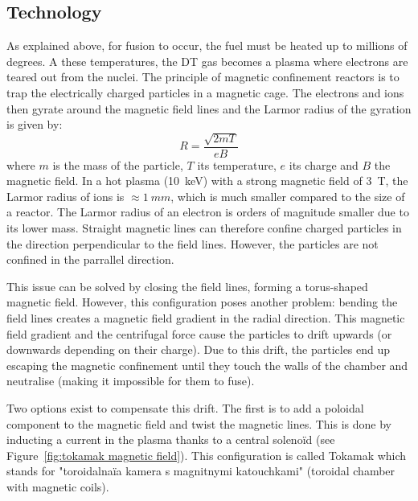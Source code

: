 \subsection{Technology}
As explained above, for fusion to occur, the fuel must be heated up to millions of degrees.
A these temperatures, the DT gas becomes a plasma where electrons are teared out from the nuclei.
The principle of magnetic confinement reactors is to trap the electrically charged particles in a magnetic cage.
The electrons and ions then gyrate around the magnetic field lines and the Larmor radius of the gyration is given by:
\begin{equation}
    R =  \frac{\sqrt{2 m T}}{e B}
\end{equation}
where $m$ is the mass of the particle, $T$ its temperature, $e$ its charge and $B$ the magnetic field.
In a hot plasma (\SI{10}{keV}) with a strong magnetic field of \SI{3}{T}, the Larmor radius of ions is $\approx \SI{1}{mm}$, which is much smaller compared to the size of a reactor.
The Larmor radius of an electron is orders of magnitude smaller due to its lower mass.
Straight magnetic lines can therefore confine charged particles in the direction perpendicular to the field lines.
However, the particles are not confined in the parrallel direction.

This issue can be solved by closing the field lines, forming a torus-shaped magnetic field.
However, this configuration poses another problem: bending the field lines creates a magnetic field gradient in the radial direction.
This magnetic field gradient and the centrifugal force cause the particles to drift upwards (or downwards depending on their charge).
Due to this drift, the particles end up escaping the magnetic confinement until they touch the walls of the chamber and neutralise (making it impossible for them to fuse).

Two options exist to compensate this drift.
The first is to add a poloidal component to the magnetic field and twist the magnetic lines.
This is done by inducting a current in the plasma thanks to a central solenoïd (see Figure~\ref{fig:tokamak magnetic field}).
This configuration is called Tokamak which stands for "toroidalnaïa kamera s magnitnymi katouchkami" (toroidal chamber with magnetic coils).

